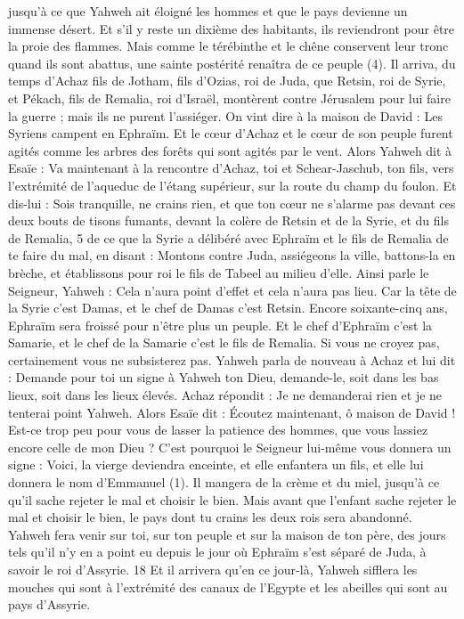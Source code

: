 \begin{multicols}{2}
jusqu’à ce que Yahweh ait éloigné les hommes et que le pays devienne un immense désert.
Et s’il y reste un dixième des habitants, ils reviendront pour être la proie des flammes. Mais comme le térébinthe et le chêne conservent leur tronc quand ils sont abattus, une sainte postérité renaîtra de ce peuple (4).
\VerseOne{}Il arriva, du temps d'Achaz fils de Jotham, fils d'Ozias, roi de Juda, que Retsin, roi de Syrie, et Pékach, fils de Remalia, roi d'Israël, montèrent contre Jérusalem pour lui faire la guerre ; mais ils ne purent l’assiéger.
On vint dire à la maison de David : Les Syriens campent en Ephraïm. Et le cœur d'Achaz et le cœur de son peuple furent agités comme les arbres des forêts qui sont agités par le vent.
Alors Yahweh dit à Esaïe : Va maintenant à la rencontre d'Achaz, toi et Schear-Jaschub, ton fils, vers l’extrémité de l’aqueduc de l’étang supérieur, sur la route du champ du foulon.
Et dis-lui : Sois tranquille, ne crains rien, et que ton cœur ne s’alarme pas devant ces deux bouts de tisons fumants, devant la colère de Retsin et de la Syrie, et du fils de Remalia, 5 de ce que la Syrie a délibéré avec Ephraïm et le fils de Remalia de te faire du mal, en disant :
Montons contre Juda, assiégeons la ville, battons-la en brèche, et établissons pour roi le fils de Tabeel au milieu d'elle.
Ainsi parle le Seigneur, Yahweh : Cela n'aura point d'effet et cela n’aura pas lieu.
Car la tête de la Syrie c'est Damas, et le chef de Damas c'est Retsin. Encore soixante-cinq ans, Ephraïm sera froissé pour n'être plus un peuple.
Et le chef d'Ephraïm c'est la Samarie, et le chef de la Samarie c'est le fils de Remalia. Si vous ne croyez pas, certainement vous ne subsisterez pas.
Yahweh parla de nouveau à Achaz et lui dit :
Demande pour toi un signe à Yahweh ton Dieu, demande-le, soit dans les bas lieux, soit dans les lieux élevés.
Achaz répondit : Je ne demanderai rien et je ne tenterai point Yahweh.
Alors Esaïe dit : Écoutez maintenant, ô maison de David ! Est-ce trop peu pour vous de lasser la patience des hommes, que vous lassiez encore celle de mon Dieu ?
C'est pourquoi le Seigneur lui-même vous donnera un signe : Voici, la vierge deviendra enceinte, et elle enfantera un fils, et elle lui donnera le nom d’Emmanuel (1).
Il mangera de la crème et du miel, jusqu’à ce qu'il sache rejeter le mal et choisir le bien.
Mais avant que l'enfant sache rejeter le mal et choisir le bien, le pays dont tu crains les deux rois sera abandonné.
Yahweh fera venir sur toi, sur ton peuple et sur la maison de ton père, des jours tels qu’il n’y en a point eu depuis le jour où Ephraïm s’est séparé de Juda, à savoir le roi d'Assyrie. 18 Et il arrivera qu'en ce jour-là, Yahweh sifflera les mouches qui sont à l’extrémité des canaux de l'Egypte et les abeilles qui sont au pays d'Assyrie.

\end{multicols}
